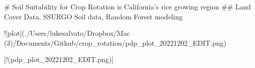 # Soil Suitability for Crop Rotation is California's rice growing region  
## Land Cover Data, SSURGO Soil data, Random Forest modeling  



![plot](./Users/lukesalvato/Dropbox/Mac (3)/Documents/Github/crop_rotation/pdp_plot_20221202_EDIT.png)

[!(pdp_plot_20221202_EDIT.png)]